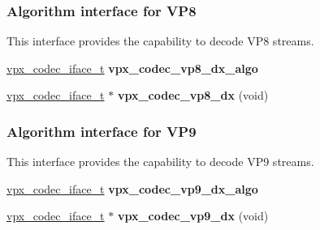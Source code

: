 \subsubsection*{Algorithm interface for V\+P8}
\label{_amgrp0b829b38ff2e659173b35cd78e0735bd}%
This interface provides the capability to decode V\+P8 streams. \begin{DoxyCompactItemize}
\item 
\hyperlink{group__codec_gae99c3b04f4a567a311211cce3ae6b83b}{vpx\+\_\+codec\+\_\+iface\+\_\+t} {\bfseries vpx\+\_\+codec\+\_\+vp8\+\_\+dx\+\_\+algo}\hypertarget{group__vp8__decoder_ga1e151f9094620511e7aa49c04bf8b79e}{}\label{group__vp8__decoder_ga1e151f9094620511e7aa49c04bf8b79e}

\item 
\hyperlink{group__codec_gae99c3b04f4a567a311211cce3ae6b83b}{vpx\+\_\+codec\+\_\+iface\+\_\+t} $\ast$ {\bfseries vpx\+\_\+codec\+\_\+vp8\+\_\+dx} (void)\hypertarget{group__vp8__decoder_ga105d15fdb6baef8a2f02d6d5283847fb}{}\label{group__vp8__decoder_ga105d15fdb6baef8a2f02d6d5283847fb}

\end{DoxyCompactItemize}
\subsubsection*{Algorithm interface for V\+P9}
\label{_amgrp9a787aae8f239d3b1cb9aeff16fb31ef}%
This interface provides the capability to decode V\+P9 streams. \begin{DoxyCompactItemize}
\item 
\hyperlink{group__codec_gae99c3b04f4a567a311211cce3ae6b83b}{vpx\+\_\+codec\+\_\+iface\+\_\+t} {\bfseries vpx\+\_\+codec\+\_\+vp9\+\_\+dx\+\_\+algo}\hypertarget{group__vp8__decoder_gabb581a7e48d55dbda975c8bfbc2d615c}{}\label{group__vp8__decoder_gabb581a7e48d55dbda975c8bfbc2d615c}

\item 
\hyperlink{group__codec_gae99c3b04f4a567a311211cce3ae6b83b}{vpx\+\_\+codec\+\_\+iface\+\_\+t} $\ast$ {\bfseries vpx\+\_\+codec\+\_\+vp9\+\_\+dx} (void)\hypertarget{group__vp8__decoder_ga62b70b5b21a01ab2d57adb9f67f25d60}{}\label{group__vp8__decoder_ga62b70b5b21a01ab2d57adb9f67f25d60}

\end{DoxyCompactItemize}
